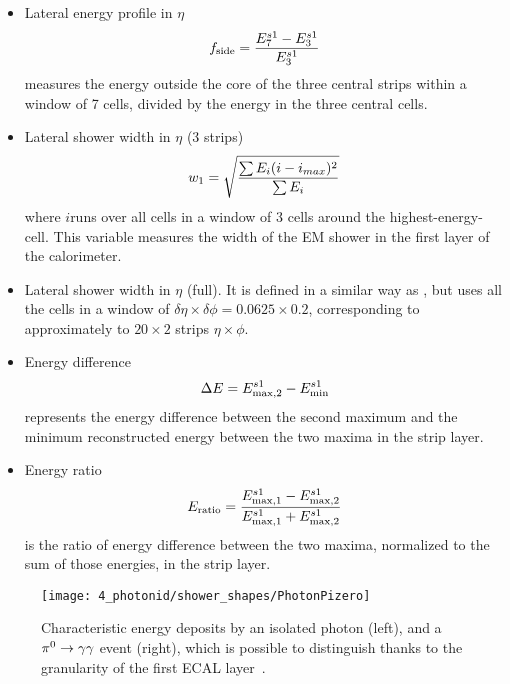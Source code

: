 \begin{itemize}
    \item Lateral energy profile in \(\eta\)
        \begin{equation}
            f_{\text{side}} = \frac{E_7^{s1} - E_3^{s1}}{E_3^{s1}}
        \end{equation}
        measures the energy outside the core of the three central strips within a window of 7 cells, divided by the energy in the three central cells.
    \item Lateral shower width in \(\eta\) (3 strips)
        \begin{equation}
            w_{1} = \sqrt{
                \frac{\sum E_i (i - i_{max})^2}{\sum E_i}
            }
        \end{equation}
        where \(i\)runs over all cells in a window of 3 cells around the highest-energy-cell. This variable measures the width of the \ac{EM} shower in the first layer of the calorimeter.
    \item Lateral shower width in \(\eta\) (full).
        It is defined in a similar way as \wone, but uses all the cells in a window of \(\delta\eta\times\delta\phi=0.0625\times 0.2\), corresponding to approximately to \(20\times 2\) strips \(\eta\times\phi\).
    \item Energy difference
        \begin{equation}
            \Delta E = E_{\text{max}, 2}^{s1} - E_{\text{min}}^{s1}
        \end{equation}
        represents the energy difference between the second maximum and the minimum reconstructed energy between the two maxima in the strip layer.
    \item Energy ratio
        \begin{equation}
            E_{\text{ratio}} = \frac{
                E_{\text{max}, 1}^{s1} - E_{\text{max}, 2}^{s1}
            }{
                E_{\text{max}, 1}^{s1} + E_{\text{max}, 2}^{s1}
            }
        \end{equation}
        is the ratio of energy difference between the two maxima, normalized to the sum of those energies, in the strip layer.
\end{itemize}

\begin{figure}[ht!]
    \centering
    \texttt{[image: 4\_photonid/shower\_shapes/PhotonPizero]}
    \caption{Characteristic energy deposits by an isolated photon (left), and a \(\pi^{0}\rightarrow\gamma\gamma\) event (right), which is possible to distinguish thanks to the granularity of the first \ac{ECAL} layer~\cite{ATLAS-ECAL-Pizero}.}
    \label{fig:pid_ss:ss:pizero}
\end{figure}






